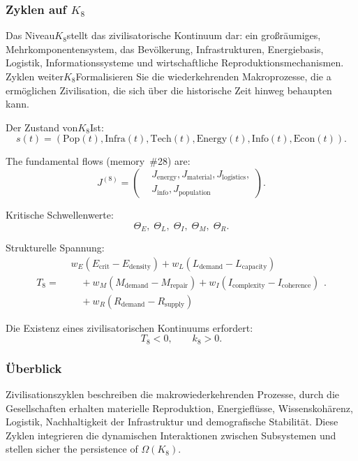 
\subsubsection{Zyklen auf \texorpdfstring{$K_8$}{K_8}}
\label{sec:cycles-k8}

Das Niveau$K_8$stellt das zivilisatorische Kontinuum dar: ein großräumiges,
Mehrkomponentensystem, das Bevölkerung, Infrastrukturen, Energiebasis,
Logistik, Informationssysteme und wirtschaftliche Reproduktionsmechanismen.
Zyklen weiter$K_8$Formalisieren Sie die wiederkehrenden Makroprozesse, die a ermöglichen
Zivilisation, die sich über die historische Zeit hinweg behaupten kann.

Der Zustand von$K_8$Ist:
\[
  s(t) = (\text{Pop}(t), \text{Infra}(t), \text{Tech}(t),
           \text{Energy}(t), \text{Info}(t), \text{Econ}(t)).
\]

The fundamental flows (memory~\#28) are:
\[
J^{(8)} =
  \left(
  \begin{aligned}
   &J_{\mathrm{energy}}, J_{\mathrm{material}}, J_{\mathrm{logistics}},\\
   &J_{\mathrm{info}}, J_{\mathrm{population}}
  \end{aligned}
  \right).
\]

Kritische Schwellenwerte:
\[
  \Theta_E,\;
  \Theta_L,\;
  \Theta_I,\;
  \Theta_M,\;
  \Theta_R.
\]

Strukturelle Spannung:
\[
T_8 =
  \begin{aligned}
    &w_E(E_{\mathrm{crit}} - E_{\mathrm{density}})
    + w_L(L_{\mathrm{demand}} - L_{\mathrm{capacity}})\\
    &\quad + w_M(M_{\mathrm{demand}} - M_{\mathrm{repair}})
    + w_I(I_{\mathrm{complexity}} - I_{\mathrm{coherence}})\\
    &\quad + w_R(R_{\mathrm{demand}} - R_{\mathrm{supply}})
  \end{aligned}
  .
\]

Die Existenz eines zivilisatorischen Kontinuums erfordert:
\[
  T_8 < 0,\qquad k_8>0.
\]

\subsubsection{Überblick}

Zivilisationszyklen beschreiben die makrowiederkehrenden Prozesse, durch die
Gesellschaften erhalten materielle Reproduktion, Energieflüsse, Wissenskohärenz,
Logistik, Nachhaltigkeit der Infrastruktur und demografische Stabilität.
Diese Zyklen integrieren die dynamischen Interaktionen zwischen Subsystemen und stellen sicher
the persistence of $\Omega(K_8)$.

